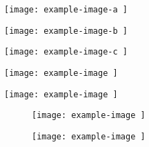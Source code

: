 \documentclass{article}
\let\vamaxheight\relax
\newlength{\vamaxheight
	}
\begin{document}
\begin{verticallyaligned}
	\noindent
	\begin{minipage}[b][\vamaxheight][b]{.30\textwidth
		}
		\centering
		\texttt{[image: example-image-a
		]}
	\end{minipage}
	\hfill
	\begin{minipage}[b][\vamaxheight][t]{.10\textwidth
		}
		\centering
		\texttt{[image: example-image-b
		]}
	\end{minipage}
	\hfill
	\begin{minipage}[b][\vamaxheight][t]{.20\textwidth
		}
		\centering
		\texttt{[image: example-image-c
		]}
	\end{minipage}
	\hfill
	\begin{minipage}[b][\vamaxheight][c]{.20\textwidth
		}
		\centering
		\texttt{[image: example-image
		]}
	\end{minipage}
	\hfill
	\begin{minipage}[b][\vamaxheight][t]{.20\textwidth
		}
		\centering
		\texttt{[image: example-image
		]}
	\end{minipage}
\end{verticallyaligned}

\lipsum[1]

\begin{figure}
	\begin{verticallyaligned}
		\noindent
		\begin{minipage}[b][\vamaxheight][c]{.50\textwidth
			}
			\centering
			\texttt{[image: example-image
			]}
			\caption{
			}
		\end{minipage}
		\hfill
		\begin{minipage}[b][\vamaxheight][t]{.40\textwidth
			}
			\centering
			\texttt{[image: example-image
			]}
			\caption{
			}
		\end{minipage}
	\end{verticallyaligned}
	\caption{
	}
\end{figure}
\end{document}
